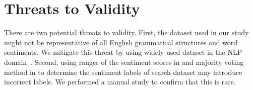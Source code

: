\section{Threats to Validity}
\label{sec:threats}

There are two potential threats to validity.
First, the dataset
used in our study might not be representative of all
English grammatical structures and word sentiments. We
mitigate this threat by using widely used dataset in the NLP
domain~\cite{husnain2021swnvalidity}.
Second, using ranges of the sentiment scores in \Sst and majority voting 
method in \Hatexp to determine the sentiment labels of search dataset may 
introduce incorrect labels. We performed a manual study to confirm that 
this is rare. 

